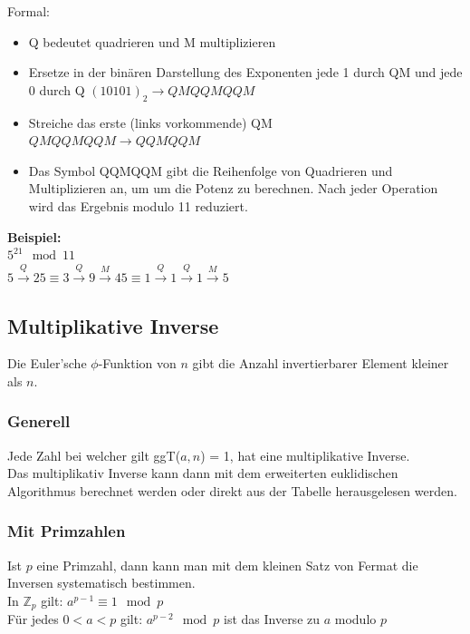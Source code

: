 \documentclass[12pt]{scrartcl}
\begin{document}
Formal:\\
\begin{itemize}
    \item Q bedeutet quadrieren und M multiplizieren
    \item Ersetze in der binären Darstellung des Exponenten jede 1 durch QM und jede 0
    durch Q $(10101)_2 \rightarrow QMQQMQQM$
    \item Streiche das erste (links vorkommende) QM\\
    $QMQQMQQM \rightarrow QQMQQM$
    \item Das Symbol QQMQQM gibt die Reihenfolge von Quadrieren und Multiplizieren an, um
    um die Potenz zu berechnen. Nach jeder Operation wird das Ergebnis modulo 11 reduziert.
\end{itemize}


\textbf{Beispiel:}\\
$5^{21} \mod 11$\\
$5 \xrightarrow{Q} 25 \equiv 3 \xrightarrow{Q} 9 \xrightarrow{M} 45 \equiv 1 \xrightarrow{Q} 1 \xrightarrow{Q} 1 \xrightarrow{M} 5$\\


\newpage
\subsection{Multiplikative Inverse}
Die Euler'sche $\phi$-Funktion von $n$ gibt die Anzahl invertierbarer Element kleiner als $n$.

\subsubsection{Generell}
Jede Zahl bei welcher gilt ggT($a,n$) = 1, hat eine multiplikative Inverse.\\
Das multiplikativ Inverse kann dann mit dem erweiterten euklidischen Algorithmus berechnet werden
oder direkt aus der Tabelle herausgelesen werden.\\


\subsubsection{Mit Primzahlen}
Ist $p$ eine Primzahl, dann kann man mit dem kleinen Satz von Fermat die Inversen systematisch bestimmen.\\
In $\mathbb{Z}_p$ gilt: $a^{p-1} \equiv 1 \mod p$\\

Für jedes $0 < a < p$ gilt: $a^{p-2} \mod p$ ist das Inverse zu $a$ modulo $p$\\
\end{document}
